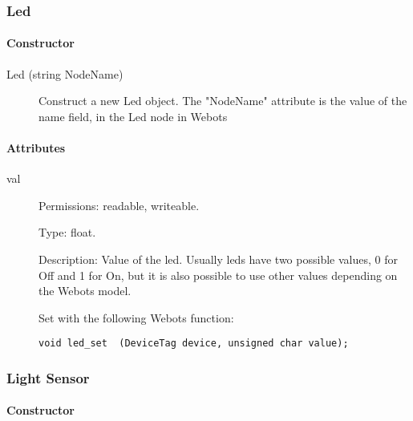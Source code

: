 \subsubsection{Led}
\label{webots.uobjects.robotdevices.led}%

\paragraph{Constructor}
\label{webots.uobjects.robotdevices.led.constructor}%

\noindent
\begin{description}
\item[{Led (string NodeName)}] Construct a new Led object. The "NodeName" attribute is the value
          of the name field, in the Led node in Webots

\end{description}

\paragraph{Attributes}
\label{webots.uobjects.robotdevices.led.attributes}%

\noindent
\begin{description}
\item[{         val
 }]            Permissions: readable, writeable.


 Type: float.


 Description: Value of the led. Usually leds have two possible values,
 0 for Off and 1 for On, but it is also possible to use other values
 depending on the Webots model.


          Set with the following Webots function:


\begin{lstlisting}[firstnumber=1,]
void led_set  (DeviceTag device, unsigned char value);
\end{lstlisting}
\end{description}

\subsubsection{Light Sensor}
\label{webots.uobjects.robotdevices.lightsensor}%

\paragraph{Constructor}
\label{webots.uobjects.robotdevices.lightsensor.constructor}%

